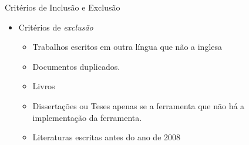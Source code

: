 \documentclass[t,14pt,mathserif]{beamer}
\begin{document}
\begin{frame}{Critérios de Inclusão e Exclusão}
    \begin{itemize}
      \item Critérios de \textit{exclusão}
               \begin{itemize}
                       \item Trabalhos escritos em outra língua que não a inglesa
                       \item Documentos duplicados.
                       \item Livros
                       \item Dissertações ou Teses apenas se a ferramenta que
                         não há a implementação da ferramenta.
                       \item Literaturas escritas antes do ano de 2008
              \end{itemize}
      \end{itemize}
\end{frame}
\end{document}
